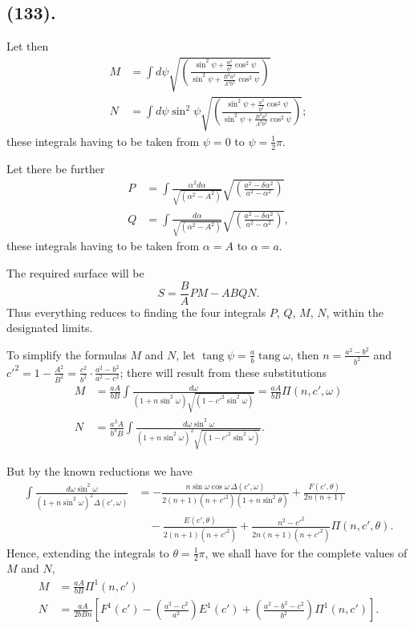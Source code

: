 \documentclass{article}
\begin{document}
\subsection*{(133).}

Let then
\[ \begin{aligned} M&=\int d\psi\sqrt{\left(\frac{\sin^{2}\psi+\frac{a^{2}}{b^{2}}\cos^{2}\psi}{\sin^{2}\psi+\frac{B^{2}a^{2}}{A^{2}b^{2}}\cos^{2}\psi}\right)}\\ N&=\int d\psi\sin^{2}\psi\sqrt{\left(\frac{\sin^{2}\psi+\frac{a^{2}}{b^{2}}\cos^{2}\psi}{\sin^{2}\psi+\frac{B^{2}a^{2}}{A^{2}b^{2}}\cos^{2}\psi}\right)}; \end{aligned} \]
these integrals having to be taken from $\psi=0$ to $\psi=\frac{1}{2}\pi$.

Let there be further
\[ \begin{aligned} P&=\int\frac{\alpha^{2}d\alpha}{\sqrt{(\alpha^{2}-A^{2})}}\sqrt{\left(\frac{a^{2}-\delta\alpha^{2}}{a^{2}-\alpha^{2}}\right)}\\ Q&=\int\frac{d\alpha}{\sqrt{(\alpha^{2}-A^{2})}}\sqrt{\left(\frac{a^{2}-\delta\alpha^{2}}{a^{2}-\alpha^{2}}\right)}, \end{aligned} \]
these integrals having to be taken from $\alpha=A$ to $\alpha=a$.

The required surface will be
\[ S=\frac{B}{A}PM-ABQN. \]
Thus everything reduces to finding the four integrals $P$, $Q$, $M$, $N$, within the designated limits.

To simplify the formulas $M$ and $N$, let $\operatorname{tang}\psi=\frac{a}{b}\operatorname{tang}\omega$, then $n=\frac{a^{2}-b^{2}}{b^{2}}$ and $c'^{2}=1-\frac{A^{2}}{B^{2}}=\frac{c^{2}}{b^{2}}\cdot\frac{a^{2}-b^{2}}{a^{2}-c^{2}}$; there will result from these substitutions
\[ \begin{aligned} M&=\frac{aA}{bB}\int\frac{d\omega}{(1+n\sin^{2}\omega)\sqrt{(1-c'^{2}\sin^{2}\omega)}}=\frac{aA}{bB}\Pi(n,c',\omega)\\ N&=\frac{a^{3}A}{b^{3}B}\int\frac{d\omega\sin^{2}\omega}{(1+n\sin^{2}\omega)^{2}\sqrt{(1-c'^{2}\sin^{2}\omega)}}. \end{aligned} \]

But by the known reductions we have
\[ \begin{aligned} \int\frac{d\omega\sin^{2}\omega}{(1+n\sin^{2}\omega)^{2}\Delta(c',\omega)}&=-\frac{n\sin\omega\cos\omega\,\Delta(c',\omega)}{2(n+1)(n+c'^{2})(1+n\sin^{2}\theta)}+\frac{F(c',\theta)}{2n(n+1)}\\ &\quad-\frac{E(c',\theta)}{2(n+1)(n+c'^{2})}+\frac{n^{2}-c'^{2}}{2n(n+1)(n+c'^{2})}\Pi(n,c',\theta). \end{aligned} \]
Hence, extending the integrals to $\theta=\frac{1}{2}\pi$, we shall have for the complete values of $M$ and $N$,
\[ \begin{aligned} M&=\frac{aA}{bB}\Pi^{1}(n,c')\\ N&=\frac{aA}{2bBn}\left[F^{1}(c')-\left(\frac{a^{2}-c^{2}}{a^{2}}\right)E^{1}(c')+\left(\frac{a^{2}-b^{2}-c^{2}}{b^{2}}\right)\Pi^{1}(n,c')\right]. \end{aligned} \]
\end{document}
